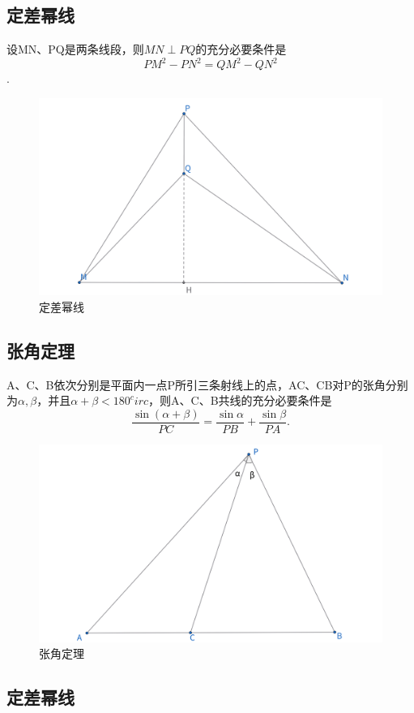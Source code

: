 \newpage
\subsection{定差幂线}
\begin{theorem}[定差幂线定理]
    设MN、PQ是两条线段，则$MN\perp PQ$的充分必要条件是
    $$PM^2-PN^2 = QM^2-QN^2$$.
\end{theorem}
\begin{figure}[ht]
    \centering
    \includegraphics[width=0.7\linewidth]{figures/定差幂线.png}
    \caption{定差幂线}
\end{figure}


\newpage 
\subsection{张角定理}
\begin{theorem}
    A、C、B依次分别是平面内一点P所引三条射线上的点，AC、CB对P的张角分别为$\alpha,\beta$，并且$\alpha+\beta<180^circ$，则A、C、B共线的充分必要条件是
    $$
    \frac{\sin(\alpha+\beta)}{PC}
    = \frac{\sin\alpha}{PB}
    +\frac{\sin\beta}{PA}.
    $$
\end{theorem}
\begin{figure}[ht]
    \centering
    \includegraphics[width=0.7\linewidth]{figures/张角定理.png}
    \caption{张角定理}
\end{figure}


\newpage 
\subsection{定差幂线}
\begin{definition}
    
\end{definition}
